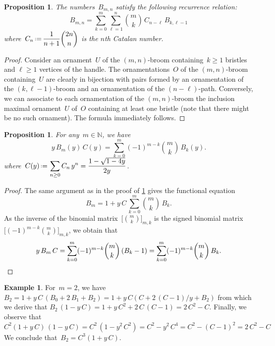 \documentclass{amsart}
\newtheorem{proposition}[theorem]{Proposition}
\theoremstyle{definition}
\newtheorem{example}[theorem]{Example}
\newcommand{\N}{\mathbb{N}} %
\newcommand{\eqdef}{\mbox{\,\raisebox{0.2ex}{\scriptsize\ensuremath{\mathrm:}}\ensuremath{=}\,}} %
\begin{document}
\begin{proposition}
\label{prop:brooms1}
The numbers~$B_{m,n}$ satisfy the following recurrence relation:
\[
B_{m,n} = \sum_{k = 0}^m \sum_{\ell = 1}^n \binom{m}{k} \, C_{n-\ell} \, B_{k,\ell-1}
\]
where~$\displaystyle C_n \eqdef \frac{1}{n+1}\binom{2n}{n}$ is the $n$th Catalan number.
\end{proposition}

\begin{proof}
Consider an ornament~$U$ of the $(m,n)$-broom containing~$k \ge 1$ bristles and $\ell \ge 1$ vertices of the handle.
The ornamentations~$O$ of the $(m,n)$-broom containing~$U$ are clearly in bijection with pairs formed by an ornamentation of the $(k, \ell-1)$-broom and an ornamentation of the $(n-\ell)$-path.
Conversely, we can associate to each ornamentation of the $(m,n)$-broom the inclusion maximal ornament~$U$ of~$O$ containing at least one bristle (note that there might be no such ornament).
The formula immediately follows.
\end{proof}

\begin{proposition}
\label{prop:brooms2}
For any~$m \in \N$, we have
\[
y \, B_m(y) \, C(y) = \sum_{k = 0}^m (-1)^{m-k} \binom{m}{k} \, B_k(y).
\]
where~$\displaystyle C(y) \eqdef \sum_{n \ge 0} C_n \, y^n = \frac{1-\sqrt{1-4y}}{2y}$.
\end{proposition}

\begin{proof}
The same argument as in the proof of \cref{prop:brooms1} gives the functional equation
\[
B_m = 1 + y \, C \, \sum_{k = 0}^m \binom{m}{k} \, B_k.
\]
As the inverse of the binomial matrix~$\big[\binom{m}{k}\big]_{m,k}$ is the signed binomial matrix~$\big[(-1)^{m-k}\binom{m}{k}\big]_{m,k}$, we obtain that
\[
y \, B_m \, C = \sum_{k = 0}^m (-1)^{m-k} \binom{m}{k} \,(B_k - 1) = \sum_{k = 0}^m (-1)^{m-k} \binom{m}{k} \, B_k.
\qedhere
\]
\end{proof}

\begin{example}
For~$m = 2$, we have
\(
B_2 = 1 + y \, C \, (B_0 + 2  \, B_1 + B_2) = 1 + y \, C( C + 2 \, (C - 1) / y + B_2)
\)
from which we derive that
\(
B_2 \, (1 - y \, C) = 1 + y \, C^2 + 2 \, C \, (C - 1) = 2 \, C^2 - C. 
\)
Finally, we observe that
\(
C^2 (1+y \, C) \, ( 1 - y \, C) = C^2 \, (1 - y^2 \, C^2) = C^2 - y^2 \, C^4 = C^2 - (C - 1)^2 = 2 \, C^2 - C
\)
We conclude that~$B_2 = C^3 (1+y \, C)$.
\end{example}
\end{document}
